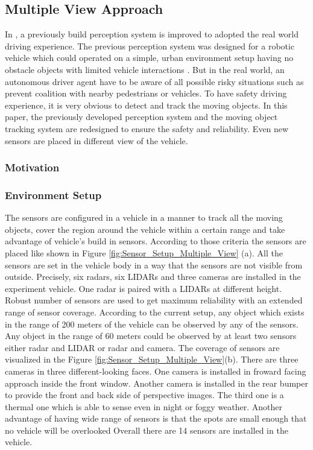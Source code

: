 \subsection{Multiple View Approach}
In \cite{Cho_2014}, a previously build perception system is improved to adopted the real world driving experience. The previous perception system was designed for a robotic vehicle which could operated on a simple, urban environment setup having no obstacle objects with limited vehicle interactions \cite{Cho_2014}. But in the real world, an autonomous driver agent have to be aware of all possible risky situations such as prevent coalition with nearby pedestrians or vehicles. To have safety driving experience, it is very obvious to detect and track the moving objects. In this paper\cite{Cho_2014}, the previously developed perception system and the moving object tracking system are redesigned to ensure the safety and reliability. Even new sensors are placed in different view of the vehicle.

\subsubsection{Motivation}

\subsubsection{Environment Setup}
The sensors are configured in a vehicle in a manner to track all the moving objects, cover the region around the vehicle within a certain range and take advantage of vehicle's build in sensors. According to those criteria the sensors are placed like shown in Figure \ref{fig:Sensor_Setup_Multiple_View} (a). All the sensors are set in the vehicle body in a way that the sensors are not visible from outside. Precisely, six radars, six LIDARs and three cameras are installed in the experiment vehicle. One radar is paired with a LIDARs at different height. Robust number of sensors are used to get maximum reliability with an extended range of sensor coverage. According to \cite{Cho_2014} the current setup, any object which exists in the range of 200 meters of the vehicle can be observed by any of the sensors. Any object in the range of 60 meters could be observed by at least two sensors either radar and LIDAR or radar and camera. The coverage of sensors are visualized in the Figure \ref{fig:Sensor_Setup_Multiple_View}(b). There are three cameras in three different-looking faces. One camera is installed in froward facing approach inside the front window. Another camera is installed in the rear bumper to provide the front and back side of perspective images. The third one is a thermal one which is able to sense even in night or foggy weather. Another advantage of having wide range of sensors is that the spots are small enough that no vehicle will be overlooked\cite{Cho_2014} Overall there are 14 sensors are installed in the vehicle.

